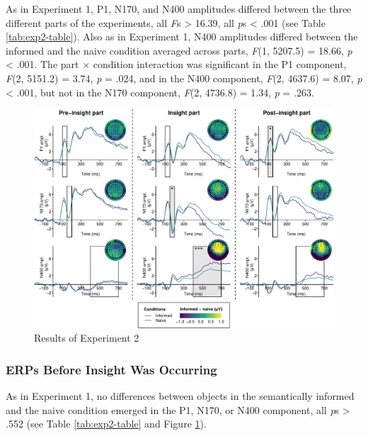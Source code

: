\documentclass[
  english,
  doc,12pt,twoside,floatsintext]{apa7}
\begin{document}
As in Experiment 1, P1, N170, and N400 amplitudes differed between the three different parts of the experiments, all \emph{F}s \textgreater{} 16.39, all \emph{p}s \textless{} .001 (see Table \ref{tab:exp2-table}). Also as in Experiment 1, N400 amplitudes differed between the informed and the naive condition averaged across parts, \emph{F}(1, 5207.5) = 18.66, \emph{p} \textless{} .001. The part × condition interaction was significant in the P1 component, \emph{F}(2, 5151.2) = 3.74, \emph{p} = .024, and in the N400 component, \emph{F}(2, 4637.6) = 8.07, \emph{p} \textless{} .001, but not in the N170 component, \emph{F}(2, 4736.8) = 1.34, \emph{p} = .263.

\begin{figure}

{\centering \includegraphics[width=1\linewidth]{master_thesis_files/figure-latex/exp2-plot-1} 

}

\caption{Results of Experiment 2\smallskip}\label{fig:exp2-plot}
\end{figure}



\hypertarget{erps-before-insight-was-occurring-1}{%
\subsubsection{ERPs Before Insight Was Occurring}\label{erps-before-insight-was-occurring-1}}

As in Experiment 1, no differences between objects in the semantically informed and the naive condition emerged in the P1, N170, or N400 component, all \emph{p}s \textgreater{} .552 (see Table \ref{tab:exp2-table} and Figure \ref{fig:exp2-plot}).
\end{document}
